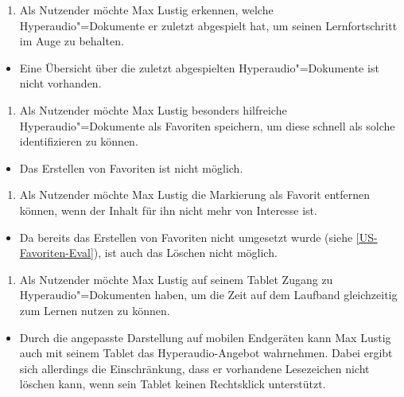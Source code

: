 \vspace{0.25cm}
\begin{enumerate}[resume*]
\item \label{US-Uebersicht-Letzte-Eval} Als Nutzender möchte Max Lustig erkennen, welche Hyperaudio"=Dokumente er zuletzt abgespielt hat, um seinen Lernfortschritt im Auge zu behalten.
\end{enumerate}
\begin{itemize}[resume*]
\item[\XSolidBrush]
Eine Übersicht über die zuletzt abgespielten Hyperaudio"=Dokumente ist nicht vorhanden.
\end{itemize}
\vspace{0.25cm}
\begin{enumerate}[resume*]
\item \label{US-Favoriten-Eval} Als Nutzender möchte Max Lustig besonders hilfreiche Hyperaudio"=Dokumente als Favoriten speichern, um diese schnell als solche identifizieren zu können.
\end{enumerate}
\begin{itemize}[resume*]
\item[\XSolidBrush]
Das Erstellen von Favoriten ist nicht möglich.
\end{itemize}
\vspace{0.25cm}
\begin{enumerate}[resume*]
\item \label{US-Favoriten-Loeschen-Eval} Als Nutzender möchte Max Lustig die Markierung als Favorit entfernen können, wenn der Inhalt für ihn nicht mehr von Interesse ist.
\end{enumerate}
\begin{itemize}[resume*]
\item[\XSolidBrush]
Da bereits das Erstellen von Favoriten nicht umgesetzt wurde (siehe \ref{US-Favoriten-Eval}), ist auch das Löschen nicht möglich.
\end{itemize}
\vspace{0.25cm}
\begin{enumerate}[resume*]
\item \label{US-Zeit-Mobil-Eval} Als Nutzender möchte Max Lustig auf seinem Tablet Zugang zu Hyperaudio"=Dokumenten haben, um die Zeit auf dem Laufband gleichzeitig zum Lernen nutzen zu können.
\end{enumerate}
\begin{itemize}[resume*]
\item[\Asterisk]
Durch die angepasste Darstellung auf mobilen Endgeräten kann Max Lustig auch mit seinem Tablet das Hyperaudio-Angebot wahrnehmen. Dabei ergibt sich allerdings die Einschränkung, dass er vorhandene Lesezeichen nicht löschen kann, wenn sein Tablet keinen Rechtsklick unterstützt.
\end{itemize}

